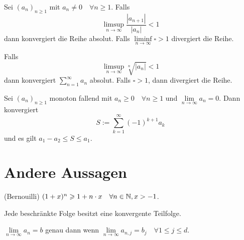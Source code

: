 \Satz[Ratio] Sei $\left(a_{n}\right)_{n \geqslant 1}$ mit $a_{n} \neq 0 \quad \forall n \geqslant 1 .$ Falls 
$$\limsup\limits_{n \rightarrow \infty} \frac{\left|a_{n+1}\right|}{\left|a_{n}\right|}<1$$ dann konvergiert die Reihe absolut.
Falls $\liminf\limits_{n \rightarrow \infty}\square > 1$ divergiert die Reihe.

\Satz[Root] Falls $$\limsup\limits_{n \rightarrow \infty} \sqrt[n]{\left|a_{n}\right|}<1$$ dann konvergiert $\sum_{n=1}^{\infty} a_{n}$ absolut. Falls $\square > 1$, dann divergiert die Reihe.

\Satz[Alternating] Sei $\left(a_{n}\right)_{n \geqslant 1}$ monoton fallend mit $a_{n} \geqslant 0 \quad \forall n \geqslant 1$ und $\lim \limits_{n \rightarrow \infty} a_{n}=0 .$ Dann konvergiert 
$$S:=\sum_{k=1}^{\infty}(-1)^{k+1} a_{k}$$ und es gilt $a_{1}-a_{2} \leqslant S \leqslant a_{1}$.


\section{Andere Aussagen}
\Lemma (Bernouilli) $(1+x)^{n} \geqslant 1+n \cdot x \quad \forall n \in \mathbb{N}, x>-1$.

\Satz[Teilfolge] Jede beschränkte Folge besitzt eine konvergente Teilfolge.

\Satz[Vektorfolge] $\lim \limits_{n \rightarrow \infty} a_{n}=b$ genau dann wenn $\lim \limits_{n \rightarrow \infty} a_{n, j}=b_{j} \quad \forall 1 \leqslant j \leqslant d$.